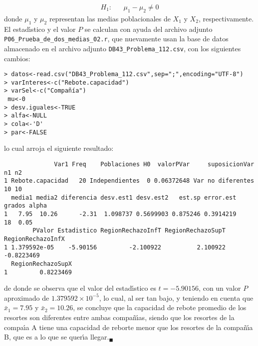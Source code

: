 \begin{solucion}
\begin{eqnarray*}
  H_1: & & \mu_1 - \mu_2 \neq  0
 \end{eqnarray*}
 donde $\mu_1$ y $\mu_2$ representan las medias poblacionales
 de $X_1$ y $X_2$, respectivamente.
 El estad\'{\i}stico y el valor $P$ se calculan con ayuda
 del archivo adjunto \texttt{P06\_Prueba\_de\_dos\_medias\_02.r},
 que nuevamente usan la base de datos almacenado en el archivo adjunto
 \texttt{DB43\_Problema\_112.csv}, con los siguientes cambios:
 \begin{verbatim}
> datos<-read.csv("DB43_Problema_112.csv",sep=";",encoding="UTF-8")
> varInteres<-c("Rebote.capacidad")
> varSel<-c("Compañía")
 mu<-0
> desv.iguales<-TRUE
> alfa<-NULL
> cola<-'D'
> par<-FALSE
 \end{verbatim}
 \vspace{-0.5cm}
 lo cual arroja el siguiente resultado:
 \begin{verbatim}
              Var1 Freq    Poblaciones H0  valorPVar     suposicionVar n1 n2
1 Rebote.capacidad   20 Independientes  0 0.06372648 Var no diferentes 10 10
  media1 media2 diferencia desv.est1 desv.est2   est.sp error.est grados alpha
1   7.95  10.26      -2.31  1.098737 0.5699903 0.875246 0.3914219     18  0.05
        PValor Estadistico RegionRechazoInfT RegionRechazoSupT RegionRechazoInfX
1 1.379592e-05    -5.90156         -2.100922          2.100922        -0.8223469
  RegionRechazoSupX
1         0.8223469
 \end{verbatim}
 \vspace{-0.5cm}
 de donde se observa que el valor del estad\'{\i}stico
 es $t = -5.90156$, con un valor $P$ aproximado
 de $1.379592\times 10^{-5}$, 
 lo cual, al ser tan bajo, y teniendo en cuenta que $\bar{x}_1 = 7.95$
 y $\bar{x}_2 = 10.26$, se concluye que la capacidad de rebote promedio
 de los resortes son diferentes entre ambas compa\~n\'{\i}as,
 siendo que los resortes de la compa\'{\i}a A tiene una capacidad
 de reborte menor que los resortes de la compa\~n\'{\i}a B,
 que es a lo que se quer\'{\i}a llegar.${}_{\blacksquare}$
\end{solucion}

